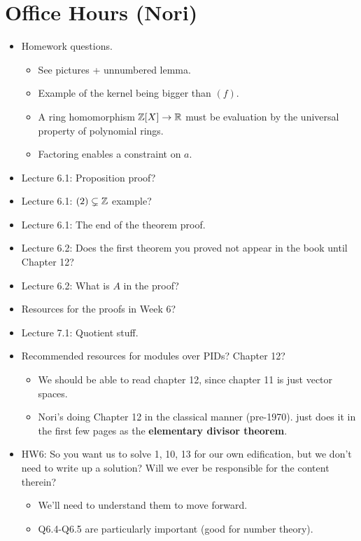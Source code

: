 \documentclass[../notes.tex]{subfiles}
\begin{document}
\section{Office Hours (Nori)}
\begin{itemize}
    \item Homework questions.
    \begin{itemize}
        \item See pictures + unnumbered lemma.
        \item Example of the kernel being bigger than $(f)$.
        \item A ring homomorphism $\mathbb{Z}[X]\to\mathbb{R}$ must be evaluation by the universal property of polynomial rings.
        \item Factoring enables a constraint on $a$.
    \end{itemize}
    \item Lecture 6.1: Proposition proof?
    \item Lecture 6.1: $(2)\subsetneq\mathbb{Z}$ example?
    \item Lecture 6.1: The end of the theorem proof.
    \item Lecture 6.2: Does the first theorem you proved not appear in the book until Chapter 12?
    \item Lecture 6.2: What is $A$ in the proof?
    \item Resources for the proofs in Week 6?
    \item Lecture 7.1: Quotient stuff.
    \item Recommended resources for modules over PIDs? Chapter 12?
    \begin{itemize}
        \item We should be able to read chapter 12, since chapter 11 is just vector spaces.
        \item Nori's doing Chapter 12 in the classical manner (pre-1970). \textcite{bib:DummitFoote} just does it in the first few pages as the \textbf{elementary divisor theorem}.
    \end{itemize}
    \item HW6: So you want us to solve 1, 10, 13 for our own edification, but we don't need to write up a solution? Will we ever be responsible for the content therein?
    \begin{itemize}
        \item We'll need to understand them to move forward.
        \item Q6.4-Q6.5 are particularly important (good for number theory).
    \end{itemize}
\end{itemize}
\end{document}
